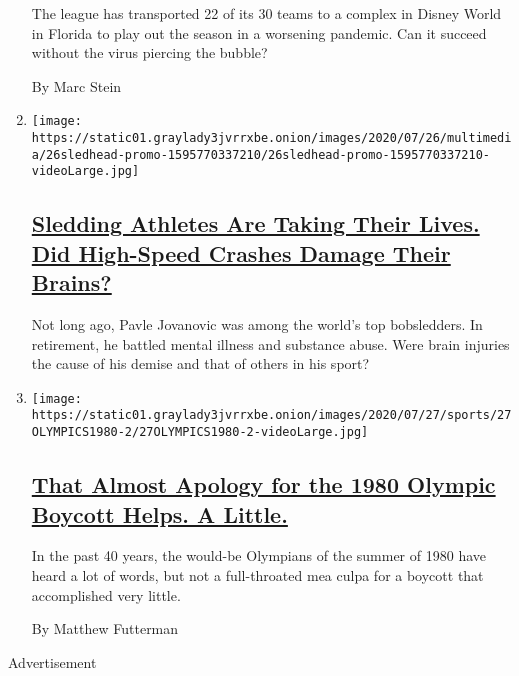 \begin{enumerate}
  The league has transported 22 of its 30 teams to a complex in Disney
  World in Florida to play out the season in a worsening pandemic. Can
  it succeed without the virus piercing the bubble?

  By Marc Stein
\item
  \texttt{[image: https://static01.graylady3jvrrxbe.onion/images/2020/07/26/multimedia/26sledhead-promo-1595770337210/26sledhead-promo-1595770337210-videoLarge.jpg]}

  \hypertarget{sledding-athletes-are-taking-their-lives-did-high-speed-crashes-damage-their-brains}{%
  \subsection{\texorpdfstring{\href{https://www.nytimes3xbfgragh.onion/2020/07/26/sports/olympics/olympics-bobsled-suicide-brain-injuries.html}{Sledding
  Athletes Are Taking Their Lives. Did High-Speed Crashes Damage Their
  Brains?}}{Sledding Athletes Are Taking Their Lives. Did High-Speed Crashes Damage Their Brains?}}\label{sledding-athletes-are-taking-their-lives-did-high-speed-crashes-damage-their-brains}}

  Not long ago, Pavle Jovanovic was among the world's top bobsledders.
  In retirement, he battled mental illness and substance abuse. Were
  brain injuries the cause of his demise and that of others in his
  sport?
\item
  \texttt{[image: https://static01.graylady3jvrrxbe.onion/images/2020/07/27/sports/27OLYMPICS1980-2/27OLYMPICS1980-2-videoLarge.jpg]}

  \hypertarget{that-almost-apology-for-the-1980-olympic-boycott-helps-a-little}{%
  \subsection{\texorpdfstring{\href{/2020/07/27/sports/olympics/1980-boycott.html}{That
  Almost Apology for the 1980 Olympic Boycott Helps. A
  Little.}}{That Almost Apology for the 1980 Olympic Boycott Helps. A Little.}}\label{that-almost-apology-for-the-1980-olympic-boycott-helps-a-little}}

  In the past 40 years, the would-be Olympians of the summer of 1980
  have heard a lot of words, but not a full-throated mea culpa for a
  boycott that accomplished very little.

  By Matthew Futterman
\end{enumerate}

Advertisement

